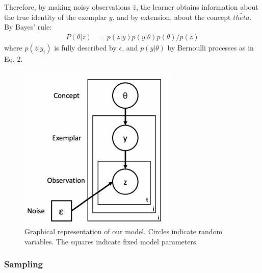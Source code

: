 \documentclass[10pt, letterpaper]{article}
\newenvironment{CodeChunk}{}{}
\begin{document}
Therefore, by making noisy observations \(\bar{z}\), the learner obtains
information about the true identity of the exemplar \(y\), and by
extension, about the concept \(\bar{theta}\). By Bayes' rule:
\begin{eqnarray}
P(\theta|\bar{z}) &= p(\bar{z}|y) p(y|\theta) p(\theta) / p(\bar{z})
\end{eqnarray} where \(p(\bar{z}|y_i)\) is fully described by
\(\epsilon\), and \(p(y|\theta)\) by Bernoulli processes as in Eq. 2.

\begin{CodeChunk}
\begin{figure}[H]

{\centering \includegraphics{figs/plate_diagram-1} 

}

\caption[Graphical representation of our model]{Graphical representation of our model. Circles indicate random variables. The squares indicate fixed model parameters.}\label{fig:plate_diagram}
\end{figure}
\end{CodeChunk}

\hypertarget{sampling}{%
\subsubsection{Sampling}\label{sampling}}
\end{document}
